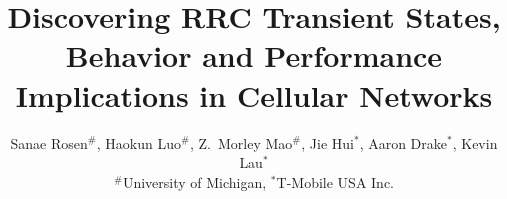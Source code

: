 \documentclass{sig-alternate-10pt}
\begin{document}
\title{Discovering RRC Transient States, Behavior and Performance Implications in Cellular Networks}


\author{
Sanae Rosen$^\#$, Haokun Luo$^\#$, Z.~Morley Mao$^\#$, Jie Hui$^*$, 
Aaron Drake$^*$, Kevin Lau$^*$\\
$^\#$University of Michigan, $^*$T-Mobile USA Inc.\footnotemark
} %

\iffalse
\numberofauthors{6}
\author{
\alignauthor
Sanae Rosen \\
	\affaddr{University of Michigan} \\
\alignauthor
Haokun Luo \\
	\affaddr{University of Michigan} \\
\alignauthor
Z. Morley Mao \\
        \affaddr{University of Michigan} \\
\and
\alignauthor
Jie Hui \\
        \affaddr{T-mobile} \\
\alignauthor
Aaron Drake \\
        \affaddr{T-mobile} \\
\alignauthor
Kevin Lau \\
        \affaddr{T-mobile} \\
}
\fi


\maketitle













\end{document}
